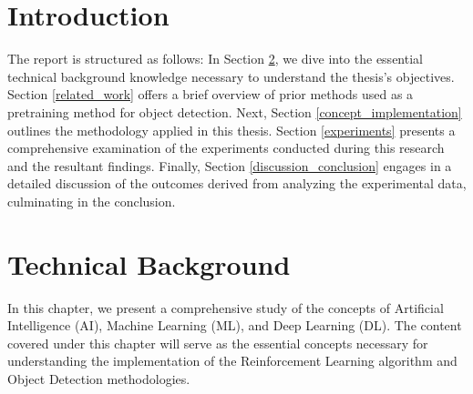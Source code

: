 \documentclass[en,]{template/rrlab}
\begin{document}

\RRLABtitlepage{}{\currentdate\today}


\RRLABsecondpage


\RRLABdeclaration{\currentdate\today}


\RRLABcontents
\chapter{Introduction}
The report is structured as follows: In Section \ref{technical_background}, we dive into the essential technical background knowledge necessary to understand the thesis's objectives. Section \ref{related_work} offers a brief overview of prior methods used as a pretraining method for object detection. Next, Section \ref{concept_implementation} outlines the methodology applied in this thesis. Section \ref{experiments} presents a comprehensive examination of the experiments conducted during this research and the resultant findings. Finally, Section \ref{discussion_conclusion} engages in a detailed discussion of the outcomes derived from analyzing the experimental data, culminating in the conclusion.


\chapter{Technical Background} \label{technical_background}
In this chapter, we present a comprehensive study of the concepts of Artificial Intelligence (AI), Machine Learning (ML), and Deep Learning (DL). The content covered under this chapter will serve as the essential concepts necessary for understanding the implementation of the Reinforcement Learning algorithm and Object Detection methodologies.
\end{document}
